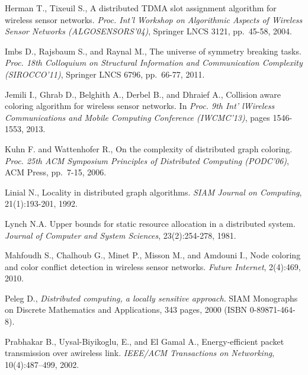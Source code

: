 \documentclass[11pt,english]{article}
\begin{document}
\begin{thebibliography}{99}
{\vspace{-0.1cm}
Herman T., Tixeuil S., 
A distributed TDMA slot assignment algorithm for wireless sensor networks.
{\it Proc. Int'l Workshop on Algorithmic Aspects of Wireless Sensor Networks
(ALGOSENSORS'04)}, Springer LNCS 3121, pp.~45-58, 2004. 

\vspace{-0.1cm}
Imbs D., Rajsbaum S., and Raynal M., 
The universe of symmetry breaking tasks. 
{\it Proc.  18th  Colloquium on  Structural Information and Communication
Complexity  (SIROCCO'11)},  Springer LNCS 6796, pp.~66-77, 2011.

\vspace{-0.1cm}
Jemili I., Ghrab D., Belghith A., Derbel B., and Dhraief A., 
Collision aware coloring algorithm for wireless sensor networks.
In {\it  Proc. 9th Int' lWireless Communications and Mobile Computing 
Conference  (IWCMC'13)}, pages 1546-1553,  2013.




\vspace{-0.1cm}
Kuhn F.  and  Wattenhofer R., 
On the complexity of distributed graph coloring.
{\it  Proc. 25th ACM Symposium  Principles of Distributed Computing (PODC'06)},
ACM Press, pp.~7-15, 2006.


\vspace{-0.1cm}
Linial N.,
Locality in distributed graph algorithms.
{\it SIAM Journal on Computing}, 21(1):193-201, 1992. 

\vspace{-0.1cm}
Lynch N.A. 
Upper bounds for static resource allocation in a distributed system.
{\it Journal of Computer and System Sciences},
23(2):254-278, 1981.





Mahfoudh S., Chalhoub G., Minet P., Misson M., and Amdouni  I.,
Node coloring and color conflict detection in wireless sensor networks. 
{\it Future Internet}, 2(4):469, 2010.


\vspace{-0.1cm}
Peleg D.,
{\it Distributed computing, a locally sensitive approach}.
 SIAM Monographs on Discrete Mathematics and Applications, 
343 pages, 2000 (ISBN  0-89871-464-8). 

\vspace{-0.1cm}
Prabhakar B., Uysal-Biyikoglu, E., and  El Gamal A.,
Energy-efficient packet transmission over awireless link.
{\it  IEEE/ACM Transactions on Networking}, 10(4):487–499,  2002.


}
\end{thebibliography}
\end{document}
